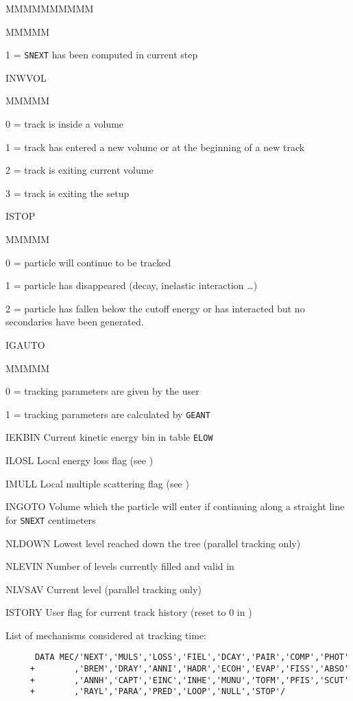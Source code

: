 \begin{DLtt}{MMMMMMMMMM}
\begin{DLtt}{MMMMM}
\item[1 =]{\tt SNEXT} has been computed in current step
\end{DLtt}
\item[INWVOL]
\begin{DLtt}{MMMMM}
\item[0 =]track is inside a volume
\item[1 =]track has entered a new volume or at the beginning of a new track
\item[2 =]track is exiting current volume
\item[3 =]track is exiting the setup
\end{DLtt}
\item[ISTOP]
\begin{DLtt}{MMMMM}
\item[0 =]particle will continue to be tracked
\item[1 =]particle has disappeared (decay, inelastic interaction \dots)
\item[2 =]particle has fallen below the cutoff energy or has interacted but
no secondaries have been generated.
\end{DLtt}
\item[IGAUTO]
\begin{DLtt}{MMMMM}
\item[0 =]tracking parameters are given by the user
\item[1 =]tracking parameters are calculated by {\tt GEANT}
\end{DLtt}
\item[IEKBIN]Current kinetic energy bin in table {\tt ELOW}
\item[ILOSL]Local energy loss flag (see )
\item[IMULL]Local multiple scattering flag (see )
\item[INGOTO]Volume which the particle will enter if continuing along
a straight line for {\tt SNEXT} centimeters
\item[NLDOWN]Lowest level reached down the tree (parallel tracking only)
\item[NLEVIN]Number of levels currently filled and valid in
\item[NLVSAV]Current level (parallel tracking only)
\item[ISTORY]User flag for current track history (reset to $0$ in
             )
\end{DLtt}
List of mechanisms considered at tracking time:
\begin{verbatim}
      DATA MEC/'NEXT','MULS','LOSS','FIEL','DCAY','PAIR','COMP','PHOT'
     +        ,'BREM','DRAY','ANNI','HADR','ECOH','EVAP','FISS','ABSO'
     +        ,'ANNH','CAPT','EINC','INHE','MUNU','TOFM','PFIS','SCUT'
     +        ,'RAYL','PARA','PRED','LOOP','NULL','STOP'/
\end{verbatim}
 
